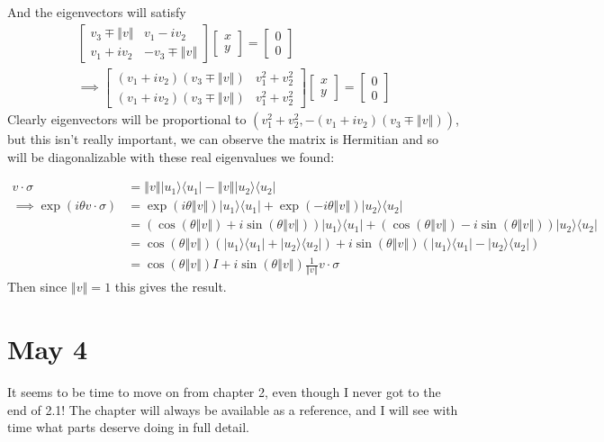 \documentclass[]{article}
\newcommand{\bra}[1]{\langle #1 |}
\newcommand{\ket}[1]{| #1 \rangle}
\newcommand{\norm}[1]{\left\Vert #1 \right\Vert}
\begin{document}
And the eigenvectors will satisfy
\begin{align*}
\left[\begin{matrix}
v_3\mp\norm{v} & v_1-iv_2\\
v_1+iv_2 & -v_3\mp\norm{v}
\end{matrix}\right]
\left[\begin{matrix}
x\\
y
\end{matrix}\right]
=
\left[\begin{matrix}
0\\
0
\end{matrix}\right]
\\\implies
\left[\begin{matrix}
(v_1+iv_2)(v_3\mp\norm{v}) & v_1^2+v_2^2\\
(v_1+iv_2)(v_3\mp\norm{v}) & v_1^2+v_2^2
\end{matrix}\right]
\left[\begin{matrix}
x\\
y
\end{matrix}\right]
=
\left[\begin{matrix}
0\\
0
\end{matrix}\right]
\end{align*}
Clearly eigenvectors will be proportional to $(v_1^2+v_2^2, -(v_1+iv_2)(v_3\mp\norm{v}))$, but this isn't really important, we can observe the matrix is Hermitian and so will be diagonalizable with these real eigenvalues we found:

\begin{align*}
v\cdot \sigma
&= \norm{v}\ket{u_1}\bra{u_1} - \norm{v}\ket{u_2}\bra{u_2}
\\\implies \exp(i\theta v\cdot \sigma)
&= \exp(i\theta \norm{v}) \ket{u_1}\bra{u_1}
 + \exp(- i\theta \norm{v})\ket{u_2}\bra{u_2}
\\&= (\cos(\theta \norm{v})+i\sin(\theta\norm{v})) \ket{u_1}\bra{u_1}
 + (\cos(\theta \norm{v})-i\sin(\theta\norm{v}))\ket{u_2}\bra{u_2}
\\&= \cos(\theta \norm{v})(\ket{u_1}\bra{u_1}  + \ket{u_2}\bra{u_2})
 + i\sin(\theta\norm{v}) (\ket{u_1}\bra{u_1} - \ket{u_2}\bra{u_2})
\\&= \cos(\theta \norm{v})I
 + i\sin(\theta\norm{v}) \frac{1}{\norm{v}} v\cdot\sigma
\end{align*}
Then since $\norm{v}=1$ this gives the result.

\section{May 4}
It seems to be time to move on from chapter 2, even though I never got to the end of 2.1! The chapter will always be available as a reference, and I will see with time what parts deserve doing in full detail.
\end{document}
